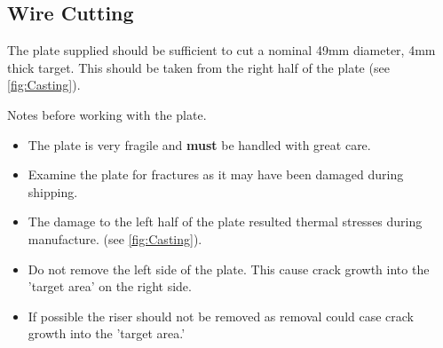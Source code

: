 \subsection{Wire Cutting}
The plate supplied should be sufficient to cut a nominal 49mm diameter, 4mm thick target. This should be taken from the right half of the plate (see \ref{fig:Casting}). 

Notes before working with the plate.
\begin{itemize}
\item The plate is very fragile and \textbf{must} be handled with great care. 
\item Examine the plate for fractures as it may have been damaged during shipping. 
\item The damage to the left half of the plate resulted thermal stresses during manufacture. (see \ref{fig:Casting}). 
\item Do not remove the left side of the plate. This cause crack growth into the 'target area' on the right side.
\item If possible the riser should not be removed as removal could case crack growth into the 'target area.'
\end{itemize}
